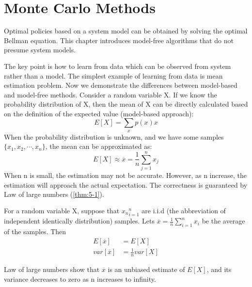 \part{Monte Carlo Methods}
Optimal policies based on a system model can be obtained by solving the optimal Bellman equation. This chapter introduces model-free algorithms
that do not presume system models. \par
The key point is how to learn from data which can be observed from system rather than a model. The simplest example of learning from data is
mean estimation problem. Now we demonstrate the differences between model-based and model-free methods. Consider a random variable X. If we
know the probability distribution of X, then the mean of X can be directly calculated based on the definition of the expected value
(model-based approach):
\begin{equation*}
	E[X] = \sum_{x}p(x)x
\end{equation*}
When the probability distribution is unknown, and we have some samples $\{x_{1},x_{2},\cdots,x_{n}\}$, the mean can be approximated as:
\begin{equation}\label{form:5-1}
	E[X] \approx \overline{x} =\frac{1}{n}\sum_{j=1}^{n}x_{j}
\end{equation}
When n is small, the estimation may not be accurate. However, as n increase, the estimation will approach the actual expectation. The
correctness is guaranteed by Law of large numbers (\ref{thm:5-1}).
\begin{theorem}\label{thm:5-1}
	For a random variable X, suppose that ${x_{n}}^{n}_{i=1}$ are i.i.d (the abbreviation of independent identically distribution) samples. Lets $\overline{x}=\frac{1}{n}\sum_{i=1}^{n} x_{i}$ be the average of the samples. Then
	\begin{align*}
		E[\overline{x}]   & = E[X]              \\
		var[\overline{x}] & = \frac{1}{n}var[X]
	\end{align*}
\end{theorem}
Law of large numbers show that $\overline{x}$ is an unbiased estimate of $E[X]$, and its variance decreases to zero as n increases to infinity. \par

